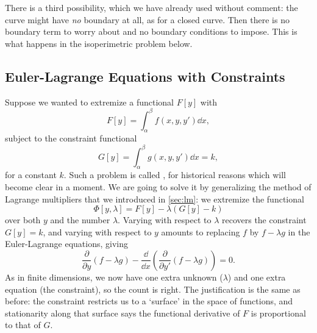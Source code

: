 \begin{remark}
	There is a third possibility, which we have already used without comment: the curve might have \emph{no} boundary at all, as for a closed curve. Then there is no boundary term to worry about and no boundary conditions to impose. This is what happens in the isoperimetric problem below.
\end{remark}

\subsection{Euler-Lagrange Equations with Constraints}

Suppose we wanted to extremize a functional $F[y]$ with
$$
F[y] = \int_{\alpha}^{\beta} f(x, y, y') \dd x,
$$
subject to the constraint functional
$$
G[y] = \int_{\alpha}^{\beta} g(x, y, y') \dd x = k,
$$
for a constant $k$. Such a problem is called , for historical reasons which will become clear in a moment. We are going to solve it by generalizing the method of Lagrange multipliers that we introduced in \autoref{sec:lm}: we extremize the functional
$$
\Phi[y, \lambda] = F[y] - \lambda \left(G[y] - k\right)
$$
over both $y$ and the number $\lambda$. Varying with respect to $\lambda$ recovers the constraint $G[y] = k$, and varying with respect to $y$ amounts to replacing $f$ by $f - \lambda g$ in the Euler-Lagrange equations, giving
$$
\frac{\partial}{\partial y}\left(f - \lambda g\right) - \frac{\dd}{\dd x}\left(\frac{\partial }{\partial y'}\left(f - \lambda g\right)\right) = 0.
$$
As in finite dimensions, we now have one extra unknown ($\lambda$) and one extra equation (the constraint), so the count is right. The justification is the same as before: the constraint restricts us to a `surface' in the space of functions, and stationarity along that surface says the functional derivative of $F$ is proportional to that of $G$.

